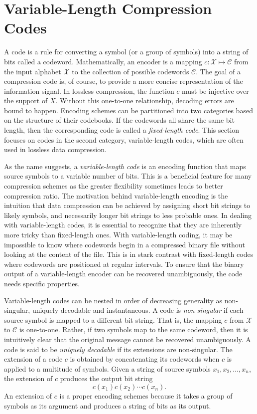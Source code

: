 \section{Variable-Length Compression Codes}

A code is a rule for converting a symbol (or a group of symbols) into a string of bits called a codeword.
Mathematically, an encoder is a mapping $c : \mathcal{X} \mapsto \mathcal{C}$ from the input alphabet $\mathcal{X}$ to the collection of possible codewords $\mathcal{C}$.
The goal of a compression code is, of course, to provide a more concise representation of the information signal.
In lossless compression, the function $c$ must be injective over the support of $X$.
Without this one-to-one relationship, decoding errors are bound to happen.
Encoding schemes can be partitioned into two categories based on the structure of their codebooks.
If the codewords all share the same bit length, then the corresponding code is called a \emph{fixed-length code}.
This section focuses on codes in the second category, variable-length codes, which are often used in lossless data compression.

As the name suggests, a \emph{variable-length code} is an encoding function that maps source symbols to a variable number of bits.
This is a beneficial feature for many compression schemes as the greater flexibility sometimes leads to better compression ratio.
The motivation behind variable-length encoding is the intuition that data compression can be achieved by assigning short bit strings to likely symbols, and necessarily longer bit strings to less probable ones.
In dealing with variable-length codes, it is essential to recognize that they are inherently more tricky than fixed-length ones.
With variable-length coding, it may be impossible to know where codewords begin in a compressed binary file without looking at the content of the file.
This is in stark contrast with fixed-length codes where codewords are positioned at regular intervals.
To ensure that the binary output of a variable-length encoder can be recovered unambiguously, the code needs specific properties.

Variable-length codes can be nested in order of decreasing generality as non-singular, uniquely decodable and instantaneous.
A code is \emph{non-singular} if each source symbol is mapped to a different bit string.
That is, the mapping $c$ from $\mathcal{X}$ to $\mathcal{C}$ is one-to-one.
Rather, if two symbols map to the same codeword, then it is intuitively clear that the original message cannot be recovered unambiguously.
A code is said to be \emph{uniquely decodable} if its extensions are non-singular.
The extension of a code $c$ is obtained by concatenating its codewords when $c$ is applied to a multitude of symbols.
Given a string of source symbols $x_1, x_2, \ldots, x_n$, the extension of $c$ produces the output bit string
\begin{equation*}
c(x_1) c(x_2) \cdots c(x_n) .
\end{equation*}
An extension of $c$ is a proper encoding schemes because it takes a group of symbols as its argument and produces a string of bits as its output.

